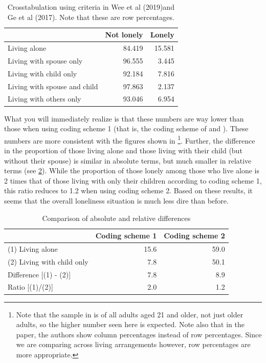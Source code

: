 \documentclass[openany]{book}
\let\rmarkdownfootnote\footnote%
\def\footnote{\protect\rmarkdownfootnote}
\begin{document}
\begin{table}[t]

\caption{\label{tab:table-lonely2}Crosstabulation using criteria in Wee et al (2019)and Ge et al (2017). Note that these are row percentages.}
\centering
\begin{tabular}{lrr}
\toprule
  & Not lonely & Lonely\\
\midrule
Living alone & 84.419 & 15.581\\
Living with spouse only & 96.555 & 3.445\\
Living with child only & 92.184 & 7.816\\
Living with spouse and child & 97.863 & 2.137\\
Living with others only & 93.046 & 6.954\\
\bottomrule
\end{tabular}
\end{table}

What you will immediately realize is that these numbers are way lower
than those when using coding scheme 1 (that is, the coding scheme of
\citet{lim_association_2017} and \citet{chan_loneliness_2015}). These
numbers are more consistent with the figures shown in
\citet{ge_social_2017}\footnote{Note that the sample in
  \citet{ge_social_2017} is of all adults aged 21 and older, not just
  older adults, so the higher number seen here is expected. Note also
  that in the paper, the authors show column percentages instead of row
  percentages. Since we are comparing across living arrangements
  however, row percentages are more appropriate.}. Further, the
difference in the proportion of those living alone and those living with
their child (but without their spouse) is similar in absolute terms, but
much smaller in relative terms (see \ref{tab:table-lonely3}). While the
proportion of those lonely among those who live alone is 2 times that of
those living with only their children according to coding scheme 1, this
ratio reduces to 1.2 when using coding scheme 2. Based on these results,
it seems that the overall loneliness situation is much less dire than
before.

\begin{table}[t]

\caption{\label{tab:table-lonely3}Comparison of absolute and relative differences}
\centering
\begin{tabular}{lrr}
\toprule
  & Coding scheme 1 & Coding scheme 2\\
\midrule
(1) Living alone & 15.6 & 59.0\\
(2) Living with child only & 7.8 & 50.1\\
Difference [(1) - (2)] & 7.8 & 8.9\\
Ratio [(1)/(2)] & 2.0 & 1.2\\
\bottomrule
\end{tabular}
\end{table}
\end{document}
